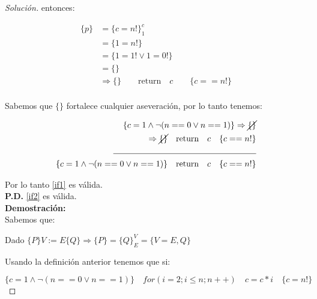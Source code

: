 \begin{proof}[Solución]
  entonces:

  \begin{equation*}
    \begin{split}
      \{p\} &= \{c = n!\}^c_1\\
      & = \{1 = n!\}\\
      & = \{1 = 1! \lor 1 = 0!\}\\
      & = \{\}\\
      & \Rightarrow \{\} \hspace{2em} \text{return}\hspace{1em} c\hspace{2em} \{c == n!\}\\
    \end{split}
  \end{equation*}

  Sabemos que $\{\}$ fortalece cualquier aseveración, por lo tanto
  tenemos:

  \begin{equation*}
    \begin{split}
      \{c = 1 \land \neg (n == 0 \lor n == 1)\} \Rightarrow \cancel{\{\}}\\
      \Rightarrow \cancel{\{\}} \hspace{1em} \text{return}\hspace{1em}
      c\hspace{1em} \{c == n!\}\\
      \rule{6cm}{0.4pt}\\
      \{c = 1 \land \neg (n == 0 \lor n == 1)\}\hspace{1em} \text{return}\hspace{1em}
      c\hspace{1em} \{c == n!\}\\
    \end{split}
  \end{equation*}

  Por lo tanto \ref{if1} es válida.\\

  \textbf{P.D.} \ref{if2} es válida.\\
  \textbf{Demostración:}\\

    Sabemos que:

  Dado $\{P\} V:=E \{Q\} \Rightarrow \{P\} = \{Q\}^V_E = \{V=E, Q\}$

  Usando la definición anterior tenemos que si:

  \begin{equation*}
    \{c = 1 \land \neg (n == 0 \lor n == 1)\} \hspace{1em} for(i = 2; i \leq n;
    n++)\hspace{1em} c = c * i \hspace{1em}\{c = n!\}
  \end{equation*}


\end{proof}
